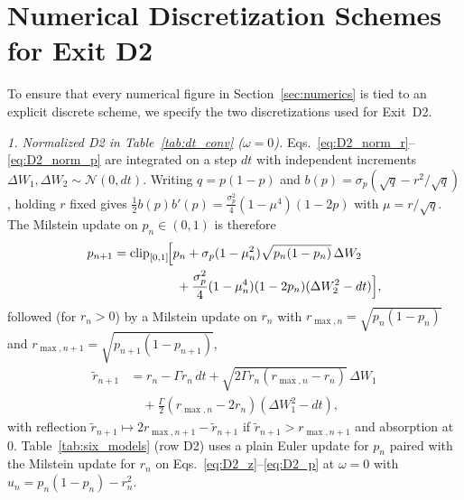 \documentclass[aps,pra,10pt,twocolumn,superscriptaddress,amsmath,amssymb,floatfix]{revtex4-2}
\begin{document}
\appendix

\section{Numerical Discretization Schemes for Exit D2}
\label{app:d2_numerics}

To ensure that every numerical figure in Section~\ref{sec:numerics} is tied to an explicit discrete scheme, we specify the two discretizations used for Exit~D2.

\emph{1. Normalized D2 in Table~\ref{tab:dt_conv} ($\omega=0$).}
Eqs.~\eqref{eq:D2_norm_r}--\eqref{eq:D2_norm_p} are integrated on a step $dt$ with independent increments $\Delta W_1, \Delta W_2 \sim \mathcal{N}(0, dt)$. Writing $q = p(1-p)$ and $b(p) = \sigma_p(\sqrt{q} - r^2/\sqrt{q})$, holding $r$ fixed gives $\frac{1}{2}b(p)b'(p) = \frac{\sigma_p^2}{4}(1-\mu^4)(1-2p)$ with $\mu = r/\sqrt{q}$. The Milstein update on $p_n \in (0,1)$ is therefore
\begin{align*}
p_{n+1} &= \mathrm{clip}_{[0,1]}\!\Bigl[p_n + \sigma_p(1-\mu_n^2)\sqrt{p_n(1-p_n)}\,\Delta W_2 \\
&\qquad\qquad\quad + \frac{\sigma_p^2}{4}(1-\mu_n^4)(1-2p_n)(\Delta W_2^2 - dt)\Bigr],
\end{align*}
followed (for $r_n > 0$) by a Milstein update on $r_n$ with $r_{\max,n} = \sqrt{p_n(1-p_n)}$ and $r_{\max,n+1} = \sqrt{p_{n+1}(1-p_{n+1})}$,
\begin{align*}
\tilde{r}_{n+1} &= r_n - \Gamma r_n\,dt + \sqrt{2\Gamma r_n(r_{\max,n}-r_n)}\,\Delta W_1 \\
&\quad + \frac{\Gamma}{2}(r_{\max,n} - 2r_n)(\Delta W_1^2 - dt),
\end{align*}
with reflection $\tilde{r}_{n+1} \mapsto 2r_{\max,n+1} - \tilde{r}_{n+1}$ if $\tilde{r}_{n+1} > r_{\max,n+1}$ and absorption at $0$. Table~\ref{tab:six_models} (row D2) uses a plain Euler update for $p_n$ paired with the Milstein update for $r_n$ on Eqs.~\eqref{eq:D2_z}--\eqref{eq:D2_p} at $\omega=0$ with $u_n = p_n(1-p_n)-r_n^2$.
\end{document}
